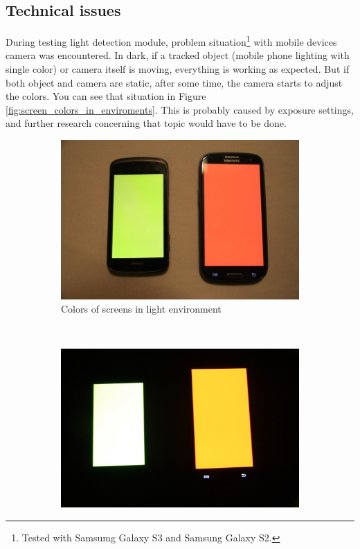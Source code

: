 \subsection{Technical issues} \label{txt:evaluation_technicalissues}
During testing light detection module, problem situation\footnote{Tested with Samsumg Galaxy S3 and Samsung Galaxy S2.} with mobile devices camera was encountered.
In dark, if a tracked object (mobile phone lighting with single color) or camera itself is moving, everything is working as expected.
But if both object and camera are static, after some time, the camera starts to adjust the colors.
You can see that situation in Figure \ref{fig:screen_colors_in_enviroments}.
This is probably caused by exposure settings, and further research concerning that topic would have to be done.
\begin{figure}[h]
        \centering
        \begin{subfigure}[b]{0.4\textwidth}
                \includegraphics[width=\textwidth]{evaluation/IMG_7029.JPG}
                \caption{Colors of screens in light environment}
                \label{fig:tiger}
        \end{subfigure}
        ~ %
        \begin{subfigure}[b]{0.4\textwidth}
                \includegraphics[width=\textwidth]{evaluation/IMG_7032.JPG}

\end{subfigure}
\end{figure}
